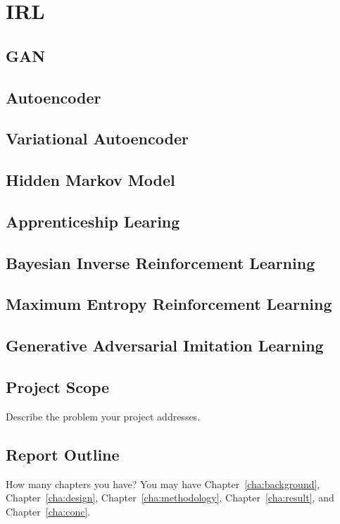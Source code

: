 \chapter{IRL}
\label{cha:Ref2}
\section{GAN}


\section{Autoencoder}

\section{Variational Autoencoder}

\section{Hidden Markov Model}


\section{Apprenticeship Learing}

\section{Bayesian Inverse Reinforcement Learning}

\section{Maximum Entropy Reinforcement Learning}

\section{Generative Adversarial Imitation Learning}
\label{sec:motivations}


\section{Project Scope}
\label{sec:projectscope}
Describe the problem your project addresses.


\section{Report Outline}
\label{sec:outline}

How many chapters you have? You may have Chapter~\ref{cha:background},
Chapter~\ref{cha:design}, Chapter~\ref{cha:methodology},
Chapter~\ref{cha:result}, and Chapter~\ref{cha:conc}.
